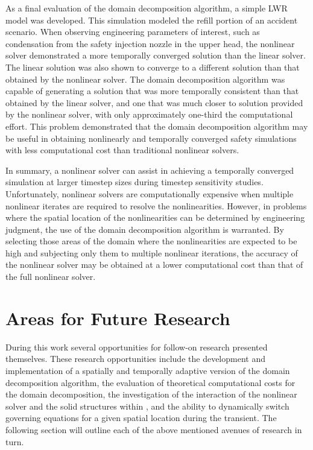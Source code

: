 As a final evaluation of the domain decomposition algorithm, a simple LWR model was developed.
This simulation modeled the refill portion of an accident scenario.
When observing engineering parameters of interest, such as condensation from the safety injection nozzle in the upper head, the nonlinear solver demonstrated a more temporally converged solution than the linear solver.
The linear solution was also shown to converge to a different solution than that obtained by the nonlinear solver.
The domain decomposition algorithm was capable of generating a solution that was more temporally consistent than that obtained by the linear solver, and one that was much closer to solution provided by the nonlinear solver, with only approximately one-third the computational effort.
This problem demonstrated that the domain decomposition algorithm may be useful in obtaining nonlinearly and temporally converged safety simulations with less computational cost than traditional nonlinear solvers.

In summary, a nonlinear solver can assist in achieving a temporally converged simulation at larger timestep sizes during timestep sensitivity studies.
Unfortunately, nonlinear solvers are computationally expensive when multiple nonlinear iterates are required to resolve the nonlinearities.
However, in problems where the spatial location of the nonlinearities can be determined by engineering judgment, the use of the domain decomposition algorithm is warranted.
By selecting those areas of the domain where the nonlinearities are expected to be high and subjecting only them to multiple nonlinear iterations, the accuracy of the nonlinear solver may be obtained at a lower computational cost than that of the full nonlinear solver.

\section{Areas for Future Research}
\label{sect:futureWork}
During this work several opportunities for follow-on research presented themselves.
These research opportunities include the development and implementation of a spatially and temporally adaptive version of the domain decomposition algorithm, the evaluation of theoretical computational costs for the domain decomposition, the investigation of the interaction of the nonlinear solver and the solid structures within \cobra{}, and the ability to dynamically switch governing equations for a given spatial location during the transient.
The following section will outline each of the above mentioned avenues of research in turn.


